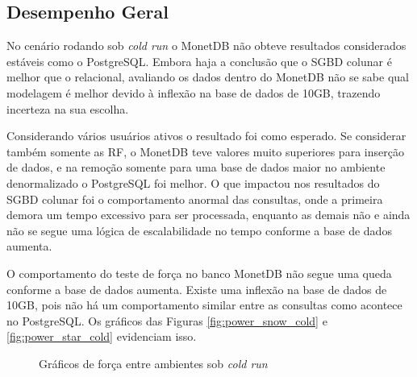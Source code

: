 \subsection{Desempenho Geral}

No cenário rodando sob \textit{cold run} o MonetDB não obteve resultados considerados estáveis como o PostgreSQL. Embora haja a conclusão que o SGBD colunar é melhor que o relacional, avaliando os dados dentro do MonetDB não se sabe qual modelagem é melhor devido à inflexão na base de dados de 10GB, trazendo incerteza na sua escolha. 

Considerando vários usuários ativos o resultado foi como esperado. Se considerar também somente as RF, o MonetDB teve valores muito superiores para inserção de dados, e na remoção somente para uma base de dados maior no ambiente denormalizado o PostgreSQL foi melhor. O que impactou nos resultados do SGBD colunar foi o comportamento anormal das consultas, onde a primeira demora um tempo excessivo para ser processada, enquanto as demais não e ainda não se segue uma lógica de escalabilidade no tempo conforme a base de dados aumenta.

O comportamento do teste de força no banco MonetDB não segue uma queda conforme a base de dados aumenta. Existe uma inflexão na base de dados de 10GB, pois não há um comportamento similar entre as consultas como acontece no PostgreSQL. Os gráficos das Figuras \ref{fig:power_snow_cold} e \ref{fig:power_star_cold} evidenciam isso. 

\begin{figure}[htpb]
        \centering
        \caption{Gráficos de força entre ambientes sob \textit{cold run}}
        \label{fig:power_cold}
\end{figure}

